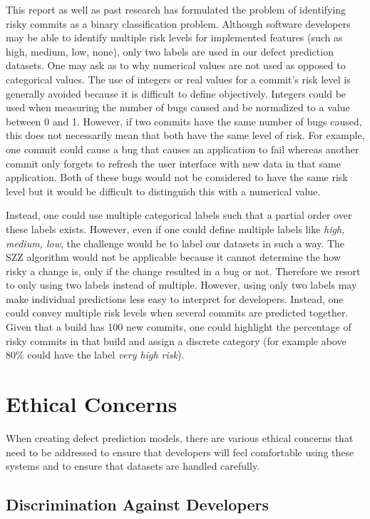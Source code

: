 \documentclass[../main.tex]{subfiles}
\begin{document}
This report as well as past research has formulated the problem of identifying risky commits as a binary classification problem. Although software developers may be able to identify multiple risk levels for implemented features (such as high, medium, low, none), only two labels are used in our defect prediction datasets. One may ask as to why numerical values are not used as opposed to categorical values. The use of integers or real values for a commit's risk level is generally avoided because it is difficult to define objectively. Integers could be used when measuring the number of bugs caused and be normalized to a value between 0 and 1. However, if two commits have the same number of bugs caused, this does not necessarily mean that both have the same level of risk. For example, one commit could cause a bug that causes an application to fail whereas another commit only forgets to refresh the user interface with new data in that same application. Both of these bugs would not be considered to have the same risk level but it would be difficult to distinguish this with a numerical value. 

Instead, one could use multiple categorical labels such that a partial order over these labels exists. However, even if one could define multiple labels like \textit{high, medium, low}, the challenge would be  to label our datasets in such a way. The SZZ algorithm would not be applicable because it cannot determine the how risky a change is, only if the change resulted in a bug or not. Therefore we resort to only using two labels instead of multiple. However, using only two labels may make individual predictions less easy to interpret for developers. Instead, one could convey multiple risk levels when several commits are predicted together. Given that a build has 100 new commits, one could highlight the percentage of risky commits in that build and assign a discrete category (for example above 80\% could have the label \textit{very high risk}). 

\section{Ethical Concerns}

When creating defect prediction models, there are various ethical concerns that need to be addressed to ensure that developers will feel comfortable using these systems and to ensure that datasets are handled carefully. 

\subsection{Discrimination Against Developers}
\end{document}

